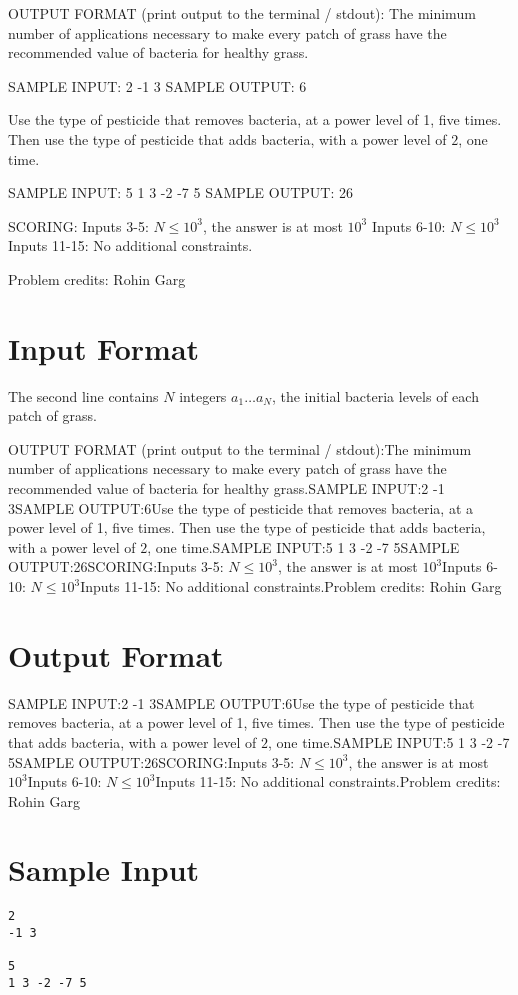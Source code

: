 \documentclass[12pt]{article}
\begin{document}
OUTPUT FORMAT (print output to the terminal / stdout):
The minimum number of applications necessary to make every patch of grass have
the recommended value of bacteria for healthy grass.

SAMPLE INPUT:
2
-1 3
SAMPLE OUTPUT: 
6

Use the type of pesticide that removes bacteria, at a power level of 1, five
times. Then use the type of pesticide that adds bacteria, with a power level of
$2$, one time.

SAMPLE INPUT:
5
1 3 -2 -7 5
SAMPLE OUTPUT: 
26

SCORING:
Inputs 3-5: $N \le 10^3$, the answer is at most $10^3$ Inputs
6-10: $N \le 10^3$ Inputs 11-15: No additional constraints. 


Problem credits: Rohin Garg



\section*{Input Format}
The second line contains $N$ integers $a_1\dots a_N$, the initial bacteria
levels of each patch of grass.

OUTPUT FORMAT (print output to the terminal / stdout):The minimum number of applications necessary to make every patch of grass have
the recommended value of bacteria for healthy grass.SAMPLE INPUT:2
-1 3SAMPLE OUTPUT:6Use the type of pesticide that removes bacteria, at a power level of 1, five
times. Then use the type of pesticide that adds bacteria, with a power level of
$2$, one time.SAMPLE INPUT:5
1 3 -2 -7 5SAMPLE OUTPUT:26SCORING:Inputs 3-5: $N \le 10^3$, the answer is at most $10^3$Inputs
6-10: $N \le 10^3$Inputs 11-15: No additional constraints.Problem credits: Rohin Garg

\section*{Output Format}
SAMPLE INPUT:2
-1 3SAMPLE OUTPUT:6Use the type of pesticide that removes bacteria, at a power level of 1, five
times. Then use the type of pesticide that adds bacteria, with a power level of
$2$, one time.SAMPLE INPUT:5
1 3 -2 -7 5SAMPLE OUTPUT:26SCORING:Inputs 3-5: $N \le 10^3$, the answer is at most $10^3$Inputs
6-10: $N \le 10^3$Inputs 11-15: No additional constraints.Problem credits: Rohin Garg

\section*{Sample Input}
\begin{verbatim}
2
-1 3

5
1 3 -2 -7 5
\end{verbatim}
\end{document}

